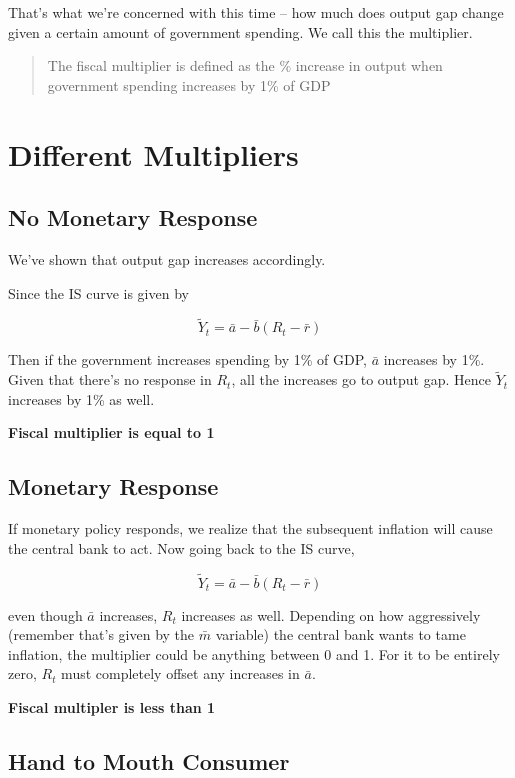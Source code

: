 \documentclass[11pt]{scrartcl}
\newcommand{\og}{\ensuremath{\tilde{Y}}}
\begin{document}
That's what we're concerned with this time -- how much does output gap change given a certain amount of government spending. We call this the multiplier.

\begin{quote}
The fiscal multiplier is defined as the \% increase in output when government spending increases by 1\% of GDP
\end{quote}

\section{Different Multipliers}

\subsection{No Monetary Response}

We've shown that output gap increases accordingly.

Since the IS curve is given by 

\[\og_t = \bar{a} - \bar{b} (R_t -\bar{r}) \]

Then if the government increases spending by 1\% of GDP, $\bar{a}$ increases by 1\%. Given that there's no response in $R_t$, all the increases go to output gap. Hence $\og_t$ increases by 1\% as well.

\textbf{Fiscal multiplier is equal to 1}

\subsection{Monetary Response}

If monetary policy responds, we realize that the subsequent inflation will cause the central bank to act. Now going back to the IS curve,

\[\og_t = \bar{a} - \bar{b} (R_t -\bar{r}) \]

even though $\bar{a}$ increases, $R_t$ increases as well. Depending on how aggressively (remember that's given by the $\bar{m}$ variable) the central bank wants to tame inflation, the multiplier could be anything between 0 and 1. For it to be entirely zero, $R_t$ must completely offset any increases in $\bar{a}$.

\textbf{Fiscal multipler is less than 1}

\subsection{Hand to Mouth Consumer}
\end{document}
